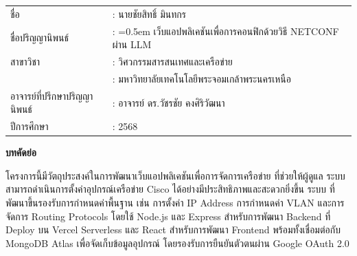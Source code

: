 {}

\vspace*{-0.5in}


\begin{tabularx}{\textwidth}{lX}
ชื่อ                           & : นายชัยสิทธิ์ มินทกร        %
\\
ชื่อปริญญานิพนธ์                  & : \hangindent=0.5em          %
                                เว็บแอปพลิเคชันเพื่อการคอนฟิกด้วยวิธี NETCONF ผ่าน LLM  %
\\
สาขาวิชา                       & : วิศวกรรมสารสนเทศและเครือข่าย %
\\
                             & : มหาวิทยาลัยเทคโนโลยีพระจอมเกล้าพระนครเหนือ
\\
อาจารย์ที่ปรึกษาปริญญานิพนธ์        & : อาจารย์ ดร.วัชรชัย คงศิริวัฒนา    %
\\
ปีการศึกษา                     & : 2568     %
\end{tabularx}

\vspace{5mm}
\begin{center}\textbf{บทคัดย่อ}\end{center}
\hspace*{1.3em} %
 โครงการนี้มีวัตถุประสงค์ในการพัฒนาเว็บแอปพลิเคชันเพื่อการจัดการเครือข่าย ที่ช่วยให้ผู้ดูแล
 ระบบสามารถดำเนินการตั้งค่าอุปกรณ์เครือข่าย Cisco ได้อย่างมีประสิทธิภาพและสะดวกยิ่งขึ้น ระบบ
 ที่พัฒนาขึ้นรองรับการกำหนดค่าพื้นฐาน เช่น การตั้งค่า IP Address การกำหนดค่า VLAN และการ
 จัดการ Routing Protocols โดยใช้ Node.js และ Express สำหรับการพัฒนา Backend ที่ Deploy บน 
 Vercel Serverless และ React สำหรับการพัฒนา Frontend พร้อมทั้งเชื่อมต่อกับ MongoDB Atlas 
 เพื่อจัดเก็บข้อมูลอุปกรณ์ โดยรองรับการยืนยันตัวตนผ่าน Google OAuth 2.0

